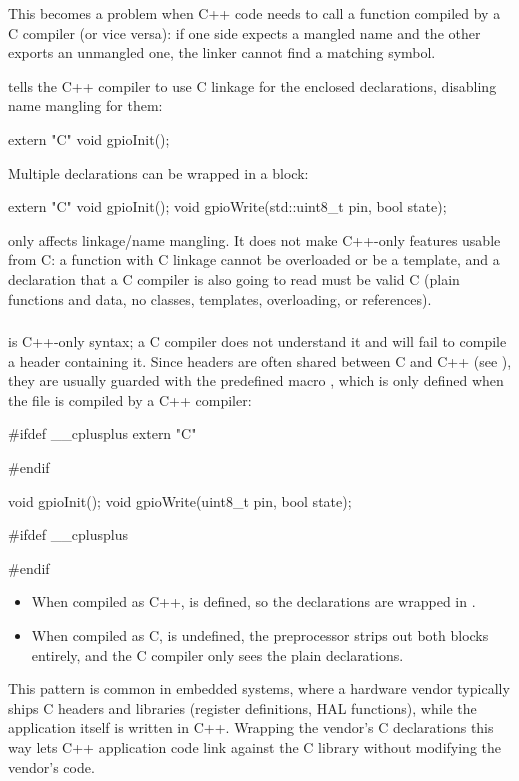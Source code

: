 This becomes a problem when C++ code needs to call a function compiled by a C compiler (or vice
versa): if one side expects a mangled name and the other exports an unmangled one, the linker
cannot find a matching symbol.

 tells the C++ compiler to use C linkage for the enclosed declarations, disabling
name mangling for them:

\begin{cppcode}
extern "C" void gpioInit();
\end{cppcode}

\noindent Multiple declarations can be wrapped in a block:

\begin{cppcode}
extern "C"
{
void gpioInit();
void gpioWrite(std::uint8_t pin, bool state);
}
\end{cppcode}

\note[Important]  only affects linkage/name mangling. It does not make C++-only
features usable from C: a function with C linkage cannot be overloaded or be a template, and a
declaration that a C compiler is also going to read must be valid C (plain functions and data, no
classes, templates, overloading, or references).

\subsubsection{}
 is C++-only syntax; a C compiler does not understand it and will fail to compile
a header containing it. Since headers are often shared between C and C++ (see
), they are usually guarded with the predefined macro ,
which is only defined when the file is compiled by a C++ compiler:

\begin{ccode}
#ifdef __cplusplus
extern "C" {
#endif

void gpioInit();
void gpioWrite(uint8_t pin, bool state);

#ifdef __cplusplus
}
#endif
\end{ccode}

\begin{itemize}
  \item When compiled as C++,  is defined, so the declarations are wrapped in
    .
  \item When compiled as C,  is undefined, the preprocessor strips out both
     blocks entirely, and the C compiler only sees the plain declarations.
\end{itemize}
This pattern is common in embedded systems, where a hardware vendor typically ships C headers and
libraries (register definitions, HAL functions), while the application itself is written in C++.
Wrapping the vendor's C declarations this way lets C++ application code link against the C library
without modifying the vendor's code.

